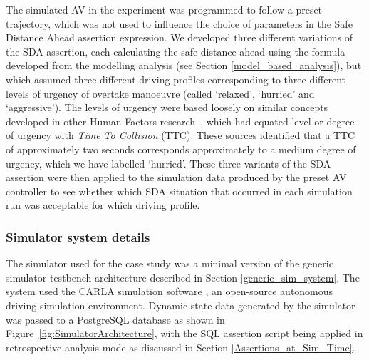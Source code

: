 
The simulated AV in the experiment was programmed to follow a preset trajectory, which was not used to influence the choice of parameters in the Safe Distance Ahead assertion expression. We developed three different variations of the SDA assertion, each calculating the safe distance ahead using the formula developed from the modelling analysis (see Section \ref{model_based_analysis}), but which assumed three different driving profiles corresponding to three different levels of urgency of overtake manoeuvre (called `relaxed', `hurried' and `aggressive'). The levels of urgency were based loosely on similar concepts developed in other Human Factors research~\cite{Chen2015,wang2019analysis}, which had equated level or degree of urgency with \emph{Time To Collision} (TTC). These sources identified that a TTC of approximately two seconds corresponds approximately to a medium degree of urgency, which we have labelled `hurried'. These three variants of the SDA assertion were then applied to the simulation data produced by the preset AV controller to see whether which SDA situation that occurred in each simulation run was acceptable for which driving profile.

\subsubsection{Simulator system details}

The simulator used for the case study was a minimal version of the generic simulator testbench architecture described in Section \ref{generic_sim_system}. The system used the CARLA simulation software \cite{CarlaSimulator}, an open-source autonomous driving simulation environment. Dynamic state data generated by the simulator was passed to a PostgreSQL database as shown in Figure~\ref{fig:SimulatorArchitecture}, with the SQL assertion script being applied in retrospective analysis mode as discussed in Section \ref{Assertions_at_Sim_Time}.


